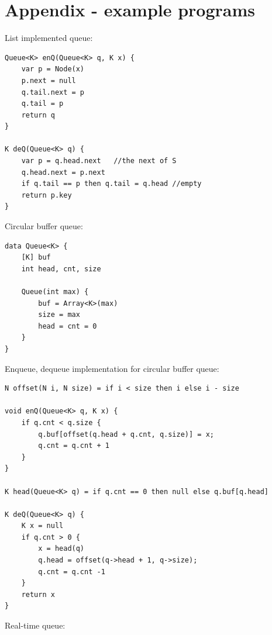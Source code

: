 \documentclass[b5paper]{article}
\begin{document}
\section{Appendix - example programs}

List implemented queue:

\begin{lstlisting}[language = Bourbaki]
Queue<K> enQ(Queue<K> q, K x) {
    var p = Node(x)
    p.next = null
    q.tail.next = p
    q.tail = p
    return q
}

K deQ(Queue<K> q) {
    var p = q.head.next   //the next of S
    q.head.next = p.next
    if q.tail == p then q.tail = q.head //empty
    return p.key
}
\end{lstlisting}

Circular buffer queue:

\begin{lstlisting}[language = Bourbaki]
data Queue<K> {
    [K] buf
    int head, cnt, size

    Queue(int max) {
        buf = Array<K>(max)
        size = max
        head = cnt = 0
    }
}
\end{lstlisting}

Enqueue, dequeue implementation for circular buffer queue:

\begin{lstlisting}
N offset(N i, N size) = if i < size then i else i - size

void enQ(Queue<K> q, K x) {
    if q.cnt < q.size {
        q.buf[offset(q.head + q.cnt, q.size)] = x;
        q.cnt = q.cnt + 1
    }
}

K head(Queue<K> q) = if q.cnt == 0 then null else q.buf[q.head]

K deQ(Queue<K> q) {
    K x = null
    if q.cnt > 0 {
        x = head(q)
        q.head = offset(q->head + 1, q->size);
        q.cnt = q.cnt -1
    }
    return x
}
\end{lstlisting}

Real-time queue:
\end{document}
